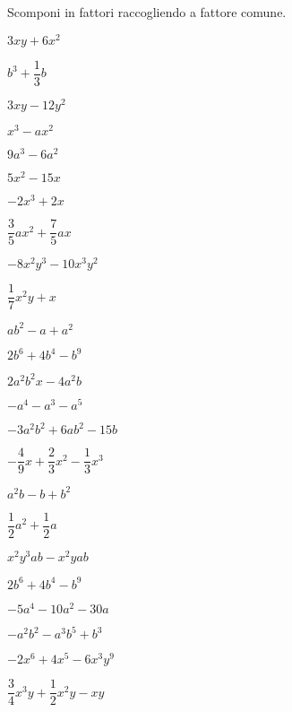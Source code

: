 \begin{esercizio}
\label{ese:div.010}
Scomponi in fattori raccogliendo a fattore comune.
\begin{multicols}{3}
\begin{enumeratea}
 \item $3xy+6x^{2}$
 \item $b^{3}+\dfrac{1}{3}b$
 \item $3xy-12y^{2}$
 \item $x^{3}-ax^{2}$
 \item $9a^{3}-6a^{2}$
 \item $5x^{2}-15x$
 \item $-2x^{3}+2x$
 \item $\dfrac{3}{5}ax^{2}+\dfrac{7}{5}ax$
 \item $-8x^{2}y^{3}-10x^{3}y^{2}$
 \item $\dfrac{1}{7}x^{2}y+x$
 \item $ab^{2}-a+a^{2}$
 \item $2b^{6}+4b^{4}-b^{9}$
 \item $2a^{2}b^{2}x-4a^{2}b$
 \item $-a^{4}-a^{3}-a^{5}$
 \item $-3a^{2}b^{2}+6ab^{2}-15b$
 \item $-{\dfrac{4}{9}}x+\dfrac{2}{3}x^{2}-\dfrac{1}{3}x^{3}$
 \item $a^{2}b-b+b^{2}$
 \item $\dfrac{1}{2}a^{2}+\dfrac{1}{2}a$
 \item $x^{2}y^{3}ab-x^{2}yab$
 \item $2b^{6}+4b^{4}-b^{9}$
 \item $-5a^{4}-10a^{2}-30a$
 \item $-a^{2}b^{2}-a^{3}b^{5}+b^{3}$
 \item $-2x^{6}+4x^{5}-6x^{3}y^{9}$
 \item $\dfrac{3}{4}x^{3}y+\dfrac{1}{2}x^{2}y-xy$
\end{enumeratea}
\end{multicols}
\end{esercizio}



